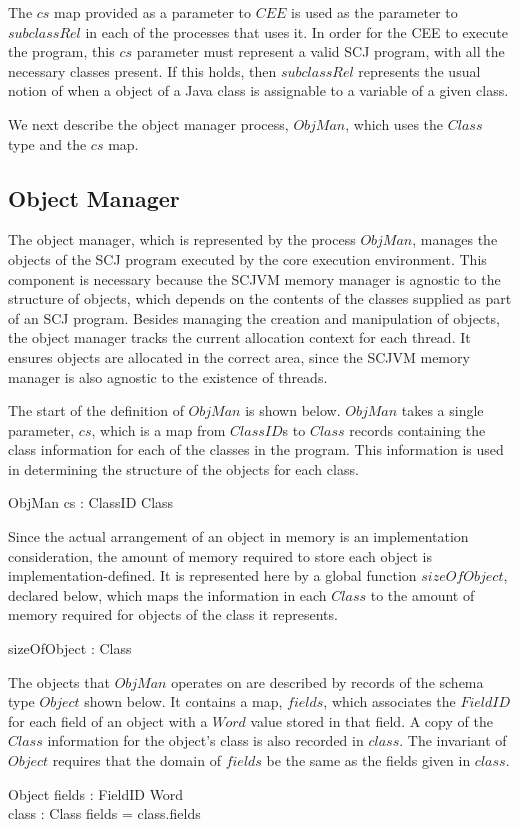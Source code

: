 The $cs$ map provided as a parameter to $CEE$ is used as the parameter
to $subclassRel$ in each of the processes that uses it.
In order for the CEE to execute the program, this $cs$ parameter must
represent a valid SCJ program, with all the necessary classes present.
If this holds, then $subclassRel$ represents the usual notion of when
a object of a Java class is assignable to a variable of a given class.

We next describe the object manager process, $ObjMan$, which uses the
$Class$ type and the $cs$ map.

\subsection{Object Manager}
\label{cee-object-manager-subsection}

The object manager, which is represented by the process $ObjMan$,
manages the objects of the SCJ program executed by the core execution
environment.
This component is necessary because the SCJVM memory manager is
agnostic to the structure of objects, which depends on the contents of
the classes supplied as part of an SCJ program.
Besides managing the creation and manipulation of objects, the object
manager tracks the current allocation context for each thread.
It ensures objects are allocated in the correct area, since the SCJVM
memory manager is also agnostic to the existence of threads.

The start of the definition of $ObjMan$ is shown below.
$ObjMan$ takes a single parameter, $cs$, which is a map from
$ClassID$s to $Class$ records containing the class information for
each of the classes in the program.
This information is used in determining the structure of the objects
for each class.
\begin{circus}
  \circprocess ObjMan \circdef cs : ClassID \pfun Class \circspot \circbegin
\end{circus}

Since the actual arrangement of an object in memory is an
implementation consideration, the amount of memory required to store
each object is implementation-defined.
It is represented here by a global function $sizeOfObject$, declared
below, which maps the information in each $Class$ to the amount of
memory required for objects of the class it represents.
\begin{axdef}
  sizeOfObject : Class \fun \nat
\end{axdef}

The objects that $ObjMan$ operates on are described by records of the
schema type $Object$ shown below.
It contains a map, $fields$, which associates the $FieldID$ for each
field of an object with a $Word$ value stored in that field.
A copy of the $Class$ information for the object's class is also
recorded in $class$.
The invariant of $Object$ requires that the domain of $fields$ be the
same as the fields given in $class$.
\begin{schema}{Object}
  fields : FieldID \pfun Word \\
  class : Class
\where
  \dom fields = class.fields
\end{schema}      

